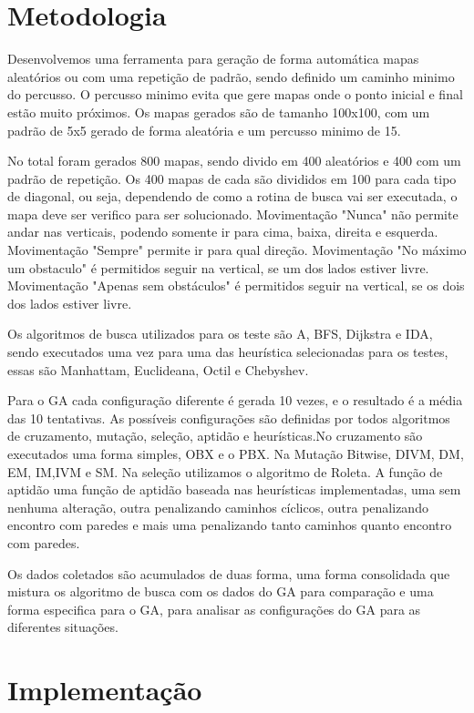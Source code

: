 \chapter[Metodologia]{Metodologia}

Desenvolvemos uma ferramenta para geração de forma automática mapas aleatórios ou com uma repetição de padrão, sendo definido um caminho minimo do percusso. O percusso minimo evita que gere mapas onde o ponto inicial e final estão muito próximos.
Os mapas gerados são de tamanho 100x100, com um padrão de 5x5 gerado de forma aleatória e um percusso minimo de 15.

No total foram gerados 800 mapas, sendo divido em 400 aleatórios e 400 com um padrão de repetição. 
Os 400 mapas de cada são divididos em 100 para cada tipo de diagonal, ou seja, dependendo de como a rotina de busca vai ser executada, o mapa deve ser verifico para ser solucionado. 
Movimentação "Nunca" não permite andar nas verticais, podendo somente ir para cima, baixa, direita e esquerda.
Movimentação "Sempre" permite ir para qual direção.
Movimentação "No máximo um obstaculo" é permitidos seguir na vertical, se um dos lados estiver livre.
Movimentação "Apenas sem obstáculos" é permitidos seguir na vertical, se os dois dos lados estiver livre.

Os algoritmos de busca utilizados para os teste são A\*, BFS, Dijkstra e IDA\*, sendo executados uma vez para uma das heurística selecionadas para os testes, essas são Manhattam, Euclideana, Octil e Chebyshev.

Para o GA cada configuração diferente é gerada 10 vezes, e o resultado é a média das 10 tentativas. As possíveis configurações são definidas por todos algoritmos de cruzamento, mutação, seleção, aptidão e heurísticas.No cruzamento são executados uma forma simples, OBX e o PBX. Na Mutação Bitwise, DIVM, DM, EM, IM,IVM e SM. Na seleção utilizamos o algoritmo de Roleta. A função de aptidão uma função de aptidão baseada nas heurísticas implementadas, uma sem nenhuma alteração, outra penalizando caminhos cíclicos, outra penalizando encontro com paredes e mais uma penalizando tanto caminhos quanto encontro com paredes. 

Os dados coletados são acumulados de duas forma, uma forma consolidada que mistura os algoritmo de busca com os dados do GA para comparação e uma forma especifica para o GA, para analisar as configurações do GA para as diferentes situações.

\chapter[Implementação]{Implementação}

